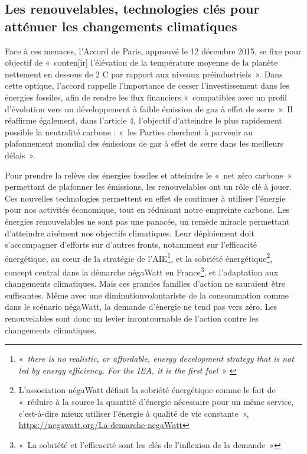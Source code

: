 \subsection{Les renouvelables, technologies clés pour atténuer les changements climatiques}
Face à ces menaces, l’Accord de Paris, approuvé le 12 décembre 2015, se fixe pour objectif de «~conten[ir] l’élévation de la température moyenne de la planète nettement en dessous de 2 \degree C par rapport aux niveaux préindustriels~». 
Dans cette optique, l’accord rappelle l’importance de cesser l’investissement dans les énergies fossiles, afin de rendre les flux financiers «~compatibles avec un profil d’évolution vers un développement  à faible émission de gaz  à effet de serre~».  Il réaffirme également, dans l’article 4, l’objectif d’atteindre le plus rapidement possible la neutralité carbone : «~les Parties cherchent  à parvenir au plafonnement mondial des émissions de gaz  à effet de serre dans les meilleurs délais ».

Pour prendre la relève des énergies fossiles et atteindre le «~net zéro carbone~» permettant de plafonner les émissions, les renouvelables ont un rôle clé à jouer. Ces nouvelles technologies permettent en effet de continuer à utiliser l’énergie pour nos activités économique, tout en réduisant notre empreinte carbone.
Les énergies renouvelables ne sont pas une panacée, un remède miracle permettant d’atteindre aisément nos objectifs climatiques. Leur déploiement doit s’accompagner d’efforts sur d’autres fronts, notamment sur l’efficacité énergétique, au cœur de la stratégie de l’AIE\footnote{« \textit{there is no realistic, or affordable, energy development strategy that is not led by energy efficiency. For the IEA, it is the first fuel}~» \citep{IEA2016Efficiency}},
et la sobriété énergétique\footnote{L'association négaWatt définit la sobriété énergétique comme le fait de «~réduire à la source la quantité d’énergie nécessaire pour un même service, c’est-à-dire mieux utiliser l’énergie à qualité de vie constante~», \url{https://negawatt.org/La-demarche-negaWatt}}, concept central dans la démarche négaWatt en France\footnote{«~La sobriété et l’efficacité sont les clés de l’inflexion de la demande~»\citep{NegaWatt2017}}, et l'adaptation aux changements climatiques.
Mais ces grandes familles d’action ne sauraient être suffisantes. Même avec une diminutionvolontariste de la consommation comme dans le scénario négaWatt, la demande d’énergie ne tend pas vers zéro. Les renouvelables sont donc un levier incontournable de l’action contre les changements climatiques.


